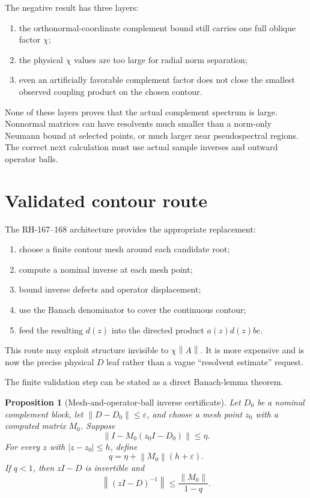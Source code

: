 \documentclass[12pt]{article}
\newtheorem{proposition}[theorem]{Proposition}
\theoremstyle{remark}
\newcommand{\norm}[1]{\left\lVert#1\right\rVert}
\begin{document}
The negative result has three layers:
\begin{enumerate}[leftmargin=2em]
\item the orthonormal-coordinate complement bound still carries one full
 oblique factor $\chi$;
\item the physical $\chi$ values are too large for radial norm separation;
\item even an artificially favorable complement factor does not close the
 smallest observed coupling product on the chosen contour.
\end{enumerate}

None of these layers proves that the actual complement spectrum is large.
Nonnormal matrices can have resolvents much smaller than a norm-only
Neumann bound at selected points, or much larger near pseudospectral regions.
The correct next calculation must use actual sample inverses and outward
operator balls.

\section{Validated contour route}

The RH-167--168 architecture provides the appropriate replacement:
\begin{enumerate}[leftmargin=2em]
\item choose a finite contour mesh around each candidate root;
\item compute a nominal inverse at each mesh point;
\item bound inverse defects and operator displacement;
\item use the Banach denominator to cover the continuous contour;
\item feed the resulting $d(z)$ into the directed product
 $a(z)d(z)bc$.
\end{enumerate}
This route may exploit structure invisible to $\chi\norm A$.  It is more
expensive and is now the precise physical $D$ leaf rather than a vague
``resolvent estimate'' request.

The finite validation step can be stated as a direct Banach-lemma theorem.

\begin{proposition}[Mesh-and-operator-ball inverse certificate]\label{prop:validated-inverse}
Let $D_0$ be a nominal complement block, let
$\norm{D-D_0}\le\varepsilon$, and choose a mesh point $z_0$ with a computed
matrix $M_0$.  Suppose
\begin{equation}\label{eq:inverse-defect}
 \norm{I-M_0(z_0I-D_0)}\le\eta.
\end{equation}
For every $z$ with $|z-z_0|\le h$, define
\begin{equation}\label{eq:q-bound}
 q=\eta+\norm{M_0}(h+\varepsilon).
\end{equation}
If $q<1$, then $zI-D$ is invertible and
\begin{equation}\label{eq:validated-resolvent}
 \norm{(zI-D)^{-1}}\le\frac{\norm{M_0}}{1-q}.
\end{equation}
\end{proposition}
\end{document}
